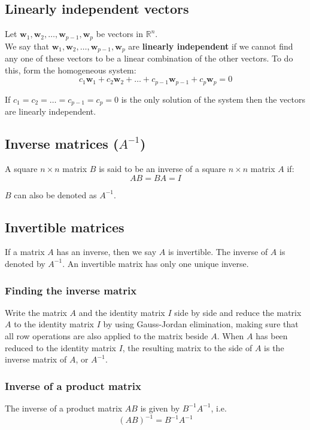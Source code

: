 \documentclass[11pt]{article}
\begin{document}
\subsection{Linearly independent vectors}
\label{sec:orgbde4e96}
Let \(\boldsymbol{w}_1, \boldsymbol{w}_2, \ldots, \boldsymbol{w}_{p-1}, \boldsymbol{w}_p\) be vectors in \(\mathbb{R}^n\).
\\[0pt]

We say that \(\boldsymbol{w}_1, \boldsymbol{w}_2, \ldots, \boldsymbol{w}_{p-1}, \boldsymbol{w}_p\) are \textbf{linearly independent} if we cannot find any one of these vectors to be a linear combination of the other vectors. To do this, form the homogeneous system:
\[c_1 \boldsymbol{w}_1 + c_2 \boldsymbol{w}_2 + \ldots + c_{p-1} \boldsymbol{w}_{p-1} + c_p \boldsymbol{w}_p = 0\]

If \(c_1 = c_2 = \ldots = c_{p-1} = c_p = 0\) is the only solution of the system then the vectors are linearly independent.

\subsection{Inverse matrices (\(A^{-1}\))}
\label{sec:orgc432e64}
A square \(n \times n\) matrix \(B\) is said to be an inverse of a square \(n \times n\) matrix \(A\) if:
\[AB = BA = I\]

\(B\) can also be denoted as \(A^{-1}\).

\subsection{Invertible matrices}
\label{sec:orgd360c31}
If a matrix \(A\) has an inverse, then we say \(A\) is invertible. The inverse of \(A\) is denoted by \(A^{-1}\). An invertible matrix has only one unique inverse.

\subsubsection{Finding the inverse matrix}
\label{sec:orgd755328}
Write the matrix \(A\) and the identity matrix \(I\) side by side and reduce the matrix \(A\) to the identity matrix \(I\) by using Gauss-Jordan elimination, making sure that all row operations are also applied to the matrix beside \(A\). When \(A\) has been reduced to the identity matrix \(I\), the resulting matrix to the side of \(A\) is the inverse matrix of \(A\), or \(A^{-1}\).

\subsubsection{Inverse of a product matrix}
\label{sec:orgd59dc8c}
The inverse of a product matrix \(AB\) is given by \(B^{-1} A^{-1}\), i.e.
\[(AB)^{-1} = B^{-1} A^{-1}\]
\end{document}
